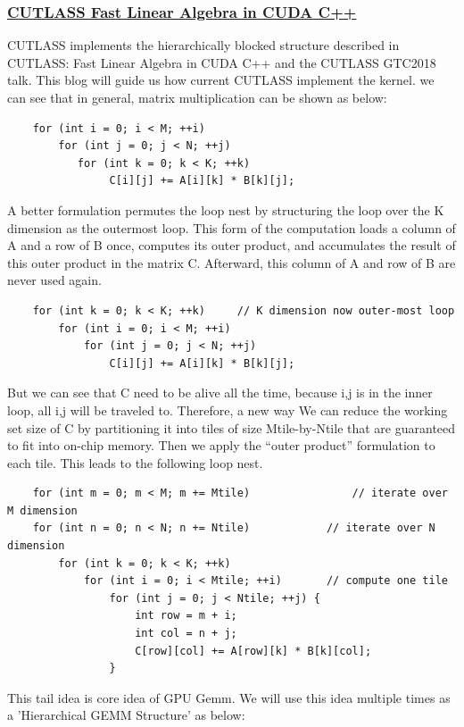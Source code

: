 \documentclass[UTF8]{article}
\begin{document}
    \subsubsection{\href{https://developer.nvidia.com/blog/cutlass-linear-algebra-cuda/}{CUTLASS Fast Linear Algebra in CUDA C++}}
    CUTLASS implements the hierarchically blocked structure described in CUTLASS: Fast Linear Algebra in CUDA C++ and the CUTLASS GTC2018 talk. This blog will guide us how current CUTLASS implement the kernel.
    \newline we can see that in general, matrix multiplication can be shown as below:
    \begin{lstlisting}
    for (int i = 0; i < M; ++i)
        for (int j = 0; j < N; ++j)
           for (int k = 0; k < K; ++k) 
                C[i][j] += A[i][k] * B[k][j];
    \end{lstlisting}
    A better formulation permutes the loop nest by structuring the loop over the K dimension as the outermost loop. This form of the computation loads a column of A and a row of B once, computes its outer product, and accumulates the result of this outer product in the matrix C. Afterward, this column of A and row of B are never used again.
    \begin{lstlisting}
    for (int k = 0; k < K; ++k)     // K dimension now outer-most loop
        for (int i = 0; i < M; ++i)
            for (int j = 0; j < N; ++j)
                C[i][j] += A[i][k] * B[k][j];
    \end{lstlisting}
    But we can see that C need to be alive all the time, because i,j is in the inner loop, all i,j will be traveled to. Therefore, a new way  We can reduce the working set size of C by partitioning it into tiles of size Mtile-by-Ntile that are guaranteed to fit into on-chip memory. Then we apply the “outer product” formulation to each tile. This leads to the following loop nest.
    \begin{lstlisting}
    for (int m = 0; m < M; m += Mtile)                // iterate over M dimension
    for (int n = 0; n < N; n += Ntile)            // iterate over N dimension
        for (int k = 0; k < K; ++k)
            for (int i = 0; i < Mtile; ++i)       // compute one tile 
                for (int j = 0; j < Ntile; ++j) {
                    int row = m + i;
                    int col = n + j;
                    C[row][col] += A[row][k] * B[k][col];
                }
    \end{lstlisting}
    This tail idea is core idea of GPU Gemm. We will use this idea multiple times as a 'Hierarchical GEMM Structure' as below:
\end{document}
